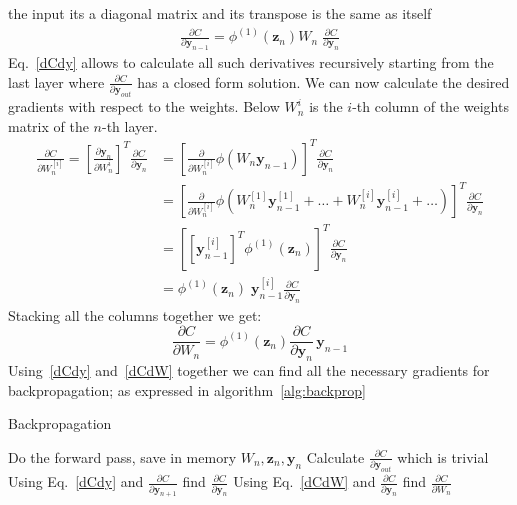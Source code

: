 \documentclass[11pt]{report}
\begin{document}
    the input its a diagonal matrix and its transpose is the same as itself
    \begin{align}
        \frac{ \partial C}{\partial \textbf{y}_{n-1} }
        =
        \phi^{(1)}( \pmb{z}_n )
        W_n \;
        \frac{ \partial C}{\partial \textbf{y}_{n} }
        \label{dCdy}
    \end{align}
    Eq.~\eqref{dCdy} allows to calculate all such derivatives recursively starting from the last layer where $\frac{\partial C}{\partial \textbf{y}_{out}}$ has a closed form solution.
    We can now calculate the desired gradients with respect to the weights.
    Below $W_n^i$ is the $i$-th column of the weights matrix of the $n$-th layer.
    \begin{align*}
        \frac{ \partial C}{\partial W_n^{[i]} }
        =
        \left[ \frac{ \partial \pmb{y}_{n}}{\partial W_n^i } \right]^T
        \frac{ \partial C}{\partial \pmb{y}_{n} }
        &=
        \left[ \frac{ \partial }{\partial W_n^{[i]} }  \phi( W_{n} \bm{y}_{n-1} )  \right]^T
        \frac{ \partial C}{\partial \pmb{y}_{n} }
        \\
        &=
        \left[ \frac{ \partial }{\partial W_n^{[i]} }  \phi(  W_{n}^{[1]} \bm{y}_{n-1}^{[1]} + \dots +W_{n}^{[i]} \bm{y}_{n-1}^{[i]} + \dots )  \right]^T
        \frac{ \partial C}{\partial \pmb{y}_{n} }
        \\
        &=
        \left[ \left[ \pmb{y}_{n-1}^{[i]} \right]^T \phi^{(1)}(\pmb{z}_n )  \right]^T
        \frac{ \partial C}{\partial \pmb{y}_{n} }
        \\
        &=
        \phi^{(1)}(\pmb{z}_n ) \; \pmb{y}_{n-1}^{[i]}
        \frac{ \partial C}{\partial \pmb{y}_{n} }
    \end{align*}
    Stacking all the columns together we get:
    \begin{equation}
        \label{dCdW}
        \frac{ \partial C}{\partial W_n}
        =
        \phi^{(1)}(\pmb{z}_n )
        \frac{ \partial C}{\partial \pmb{y}_{n} }  \,
        \pmb{y}_{n-1}
    \end{equation}
    Using~\eqref{dCdy} and~\eqref{dCdW} together we can find all the necessary gradients for backpropagation; as expressed in algorithm~\ref{alg:backprop}
    \begin{algorithm}
        \caption{Backpropagation}
        \label{alg:backprop}
        \begin{algorithmic}
            \State Do the forward pass, save in memory $W_n, \textbf{z}_n, \textbf{y}_n$
            \State Calculate $\frac{\partial C}{\partial \textbf{y}_{out}}$ which is trivial
                \State Using Eq.~\eqref{dCdy} and  $\frac{\partial C}{\partial \textbf{y}_{n+1}} $ find $\frac{\partial C}{\partial \textbf{y}_n}$
                \State  Using Eq.~\eqref{dCdW} and $\frac{\partial C}{\partial \textbf{y}_n}$ find $\frac{\partial C}{\partial W_n}$
            \EndFor
        \end{algorithmic}
    \end{algorithm}
\end{document}
